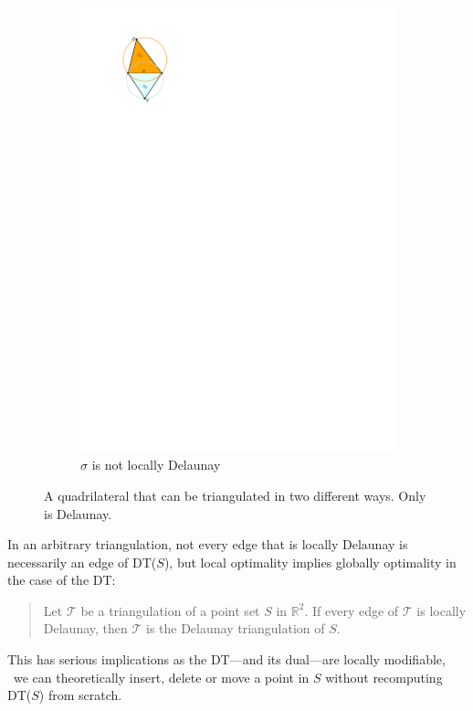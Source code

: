 \begin{figure}
\begin{subfigure}[b]{0.45\linewidth}
		\includegraphics[width=\textwidth,page=2]{figs/local}
		\caption{$\sigma$ is not locally Delaunay}\label{fig:local:b}
	\end{subfigure}%
	\caption{A quadrilateral that can be triangulated in two different ways. Only  is Delaunay.}%
\label{fig:local}
\end{figure}
In an arbitrary triangulation, not every edge that is locally Delaunay is necessarily an edge of DT($S$), but local optimality implies globally optimality in the case of the DT:
\begin{quote}
  Let $\mathcal{T}$ be a triangulation of a point set $S$ in $\mathbb{R}^2$. If every edge of $\mathcal{T}$ is locally Delaunay, then $\mathcal{T}$ is the Delaunay triangulation of $S$.
\end{quote}
This has serious implications as the DT---and its dual---are locally modifiable, \ie\ we can theoretically insert, delete or move a point in $S$ without recomputing DT($S$) from scratch.



